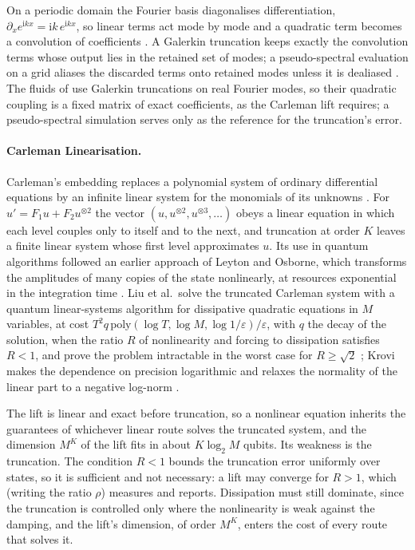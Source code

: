 On a periodic domain the Fourier basis diagonalises differentiation, $\partial_xe^{\mathrm{i}kx}=\mathrm{i}k\,e^{\mathrm{i}kx}$, so linear terms act mode by mode and a quadratic term becomes a convolution of coefficients \cite{canuto2006spectral}. A Galerkin truncation keeps exactly the convolution terms whose output lies in the retained set of modes; a pseudo-spectral evaluation on a grid aliases the discarded terms onto retained modes unless it is dealiased \cite{canuto2006spectral}. The fluids of  use Galerkin truncations on real Fourier modes, so their quadratic coupling is a fixed matrix of exact coefficients, as the Carleman lift requires; a pseudo-spectral simulation serves only as the reference for the truncation's error.

\paragraph{Carleman Linearisation.}
\label{sec:bg-carleman}

Carleman's embedding replaces a polynomial system of ordinary differential equations by an infinite linear system for the monomials of its unknowns \cite{carleman1932,kowalskisteeb1991}. For $u'=F_1u+F_2u^{\otimes2}$ the vector $(u,u^{\otimes2},u^{\otimes3},\dots)$ obeys a linear equation in which each level couples only to itself and to the next, and truncation at order $K$ leaves a finite linear system whose first level approximates $u$. Its use in quantum algorithms followed an earlier approach of Leyton and Osborne, which transforms the amplitudes of many copies of the state nonlinearly, at resources exponential in the integration time \cite{leyton2008nonlinear}. Liu et al.\ solve the truncated Carleman system with a quantum linear-systems algorithm for dissipative quadratic equations in $M$ variables, at cost $T^2q\,\mathrm{poly}(\log T,\log M,\log1/\varepsilon)/\varepsilon$, with $q$ the decay of the solution, when the ratio $R$ of nonlinearity and forcing to dissipation satisfies $R<1$, and prove the problem intractable in the worst case for $R\ge\sqrt2$ \cite{liu2021carleman}; Krovi makes the dependence on precision logarithmic and relaxes the normality of the linear part to a negative log-norm \cite{krovi2023improved}.

The lift is linear and exact before truncation, so a nonlinear equation inherits the guarantees of whichever linear route solves the truncated system, and the dimension $M^K$ of the lift fits in about $K\log_2M$ qubits. Its weakness is the truncation. The condition $R<1$ bounds the truncation error uniformly over states, so it is sufficient and not necessary: a lift may converge for $R>1$, which  (writing the ratio $\rho$) measures and  reports. Dissipation must still dominate, since the truncation is controlled only where the nonlinearity is weak against the damping, and the lift's dimension, of order $M^K$, enters the cost of every route that solves it.

